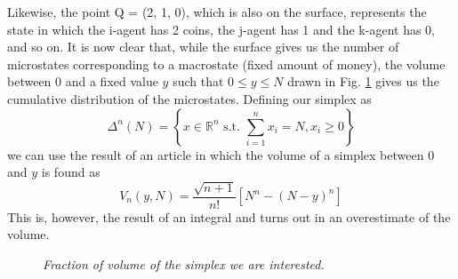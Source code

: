 Likewise, the point Q = (2, 1, 0), which is also on the surface, represents the state in which the i-agent has 2 coins, the j-agent has 1 and the k-agent has 0, and so on.
It is now clear that, while the surface gives us the number of microstates corresponding to a macrostate (fixed amount of money), the volume between 0 and a fixed value $y$ such that $0 \leq y \leq N$ drawn in Fig. \ref{fig:simplexVolume} gives us the cumulative distribution of the microstates.
Defining our simplex as
\begin{equation*}
    \Delta^n(N)=\left\{x \in \mathbb{R}^n \text{ s.t. } \sum_{i = 1}^n x_i = N, x_i \geq 0\right\}
\end{equation*}
we can use the result of an article \cite{simplexSampling} in which the volume of a simplex between 0 and $y$ is found as
\begin{equation*}
    V_n\left(y, N\right) = \frac{\sqrt{n+1}}{n!}\left[N^n - \left(N - y\right)^n\right]
\end{equation*}
This is, however, the result of an integral and turns out in an overestimate of the volume.
\begin{figure}[ht!]
    \centering
    \caption{\emph{Fraction of volume of the simplex we are interested.}}
    \label{fig:simplexVolume}
\end{figure}
